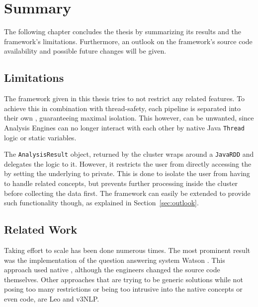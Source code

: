 \chapter{Summary}\label{ch:summary}
The following chapter concludes the thesis by summarizing its results and the framework's limitations. Furthermore, an outlook on the framework's source code availability and possible future changes will be given.

\section{Limitations}
The framework given in this thesis tries to not restrict any \uima{} related features. To achieve this in combination with thread-safety, each pipeline is separated into their own \jvm{}, guaranteeing maximal isolation. This however, can be unwanted, since Analysis Engines can no longer interact with each other by native Java \lstinline|Thread| logic or static variables. 

The \lstinline|AnalysisResult| object, returned by the \spark{} cluster wraps around a \lstinline|JavaRDD| and delegates the logic to it. However, it restricts the user from directly accessing the \spark{} \api{} by setting the underlying \rdd{} to private. This is done to isolate the user from having to handle \spark{} related concepts, but prevents further processing inside the cluster before collecting the data first. The framework can easily be extended to provide such functionality though, as explained in Section~\ref{sec:outlook}. 


\section{Related Work}
\label{sec:related}
Taking effort to scale \uima{} has been done numerous times. The most prominent result was the implementation of the question answering system Watson \cite{epstein2012making}. This approach used native \uimaas{}, although the engineers changed the \uimaas{} source code themselves. Other approaches that are trying to be generic solutions while not posing too many restrictions or being too intrusive into the native \uima{} concepts or even code, are Leo and v3NLP.
